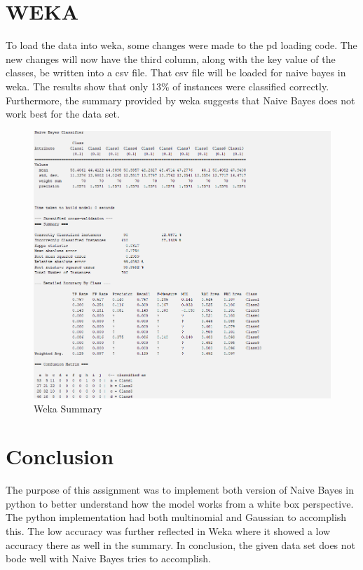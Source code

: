 \documentclass{article}
\begin{document}
\section{WEKA}
To load the data into weka, some changes were made to the pd loading code. The new changes will now have the third column, along with the key value of the classes, be written into a csv file. That csv file will be loaded for naive bayes in weka. The results show that only 13\% of instances were classified correctly. Furthermore, the summary provided by weka suggests that Naive Bayes does not work best for the data set.
\begin{figure}
    \centering
    \includegraphics[width=0.5\linewidth]{7.png}
    \caption{Weka Summary}
    \label{fig:enter-label}
\end{figure}
\section{Conclusion}
The purpose of this assignment was to implement both version of Naive Bayes in python to better understand how the model works from a white box perspective. The python implementation had both multinomial and Gaussian to accomplish this. The low accuracy was further reflected in Weka where it showed a low accuracy there as well in the summary. In conclusion, the given data set does not bode well with Naive Bayes tries to accomplish.
\end{document}
